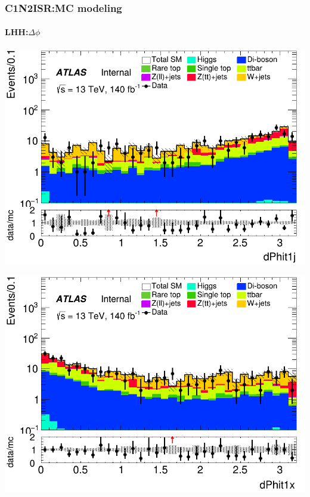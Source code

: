 \documentclass[usenames,dvipsnames]{beamer}
\begin{document}
\begin{frame}
\frametitle{C1N2ISR:MC modeling}
\framesubtitle{LHH:\quad $\Delta\phi$}
    \begin{minipage}{0.32\textwidth}
        \centering
        \includegraphics[width=\textwidth]{graphics/LHH_met/LHH_met_dPhit1j.png}
    \end{minipage}
    \hfill
    \begin{minipage}{0.32\textwidth}
        \centering
        \includegraphics[width=\textwidth]{graphics/LHH_met/LHH_met_dPhit1x.png}
    \end{minipage}
    \hfill
    \begin{minipage}{0.32\textwidth}
        \centering

\end{minipage}
\end{frame}
\end{document}
